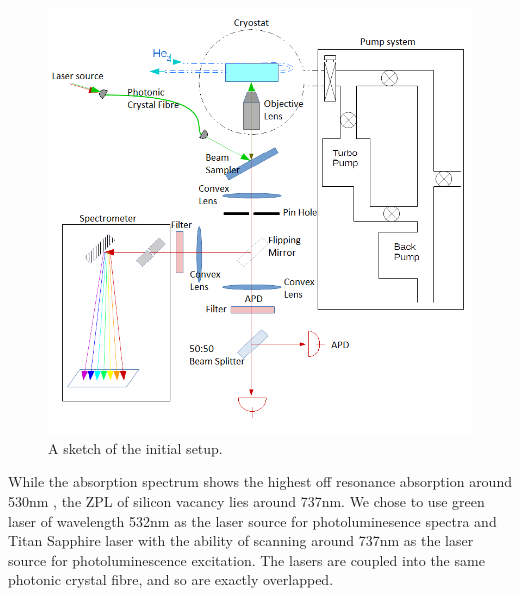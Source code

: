 \begin{figure}[h]
\centering
\includegraphics[width=1\linewidth]{Figures/pic/initialsetup}
\caption{A sketch of the initial setup.}
\label{fig:initialsetup}
\end{figure}

While the absorption spectrum shows the highest off resonance absorption around 530nm \citep{iakoubovskii_luminescence_2000,albrecht_coupling_2013,rogers_electronic_2014}, the ZPL of silicon vacancy lies around 737nm. We chose to use green laser of wavelength 532nm as the laser source for photoluminesence spectra and Titan Sapphire laser with the ability of scanning around 737nm as the laser source for photoluminescence excitation. The lasers are coupled into the same photonic crystal fibre, and so are exactly overlapped.

